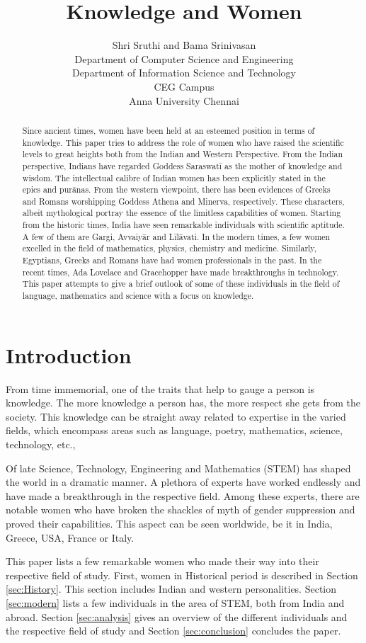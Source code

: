 \documentclass[a4paper,10pt]{article}
\title{Knowledge and Women}
\author{Shri Sruthi and Bama Srinivasan \\  Department of Computer Science and Engineering \\  Department of Information Science and Technology \\ CEG Campus \\Anna University Chennai}
\date{}
\begin{document}
\maketitle

\begin{abstract}
Since ancient times, women have been held at an esteemed position in terms of knowledge. This paper tries to address the role of women who have raised the scientific levels to great heights both from the Indian and Western Perspective. From the Indian perspective, Indians have regarded Goddess Saraswat\={i} as the mother of knowledge and wisdom. The intellectual calibre of Indian women has been explicitly stated in the epics and pur\={a}nas. From the western viewpoint,  there has been evidences of Greeks and Romans worshipping Goddess Athena and Minerva, respectively. These characters, albeit mythological portray the essence of the limitless capabilities of women. Starting from the historic times, India have seen remarkable individuals with scientific aptitude. A few of them are Gargi, Avvaiy\={a}r and L\={i}l\={a}vati. In the modern times, a few women excelled in the field of mathematics, physics, chemistry and medicine. Similarly, Egyptians, Greeks and Romans have had women professionals in the past. In 
the recent times, Ada Lovelace and Gracehopper have made breakthroughs in technology. This paper attempts to give a brief outlook of some of these individuals in the field of language, mathematics and science with a focus on knowledge. 
\end{abstract}
\section{Introduction}
From time immemorial, one of the traits that help to gauge a person is knowledge. The more knowledge a person has, the more respect she gets from the society. This knowledge can be straight away related to expertise in the varied fields, which encompass areas such as language, poetry, mathematics, science, technology, etc., 

Of late Science, Technology, Engineering and Mathematics (STEM) has shaped the world in a dramatic manner. A plethora of experts have worked endlessly and have made a breakthrough in the respective field. Among these experts, there are notable women who have broken the shackles of myth of gender suppression and proved their capabilities. This aspect can be seen worldwide, be it in India, Greece, USA, France or Italy. 

This paper lists a few remarkable women who made their way into their respective field of study. First, women in Historical period is described in Section \ref{sec:History}. This section includes Indian and western personalities. Section \ref{sec:modern} lists a few individuals in the area of STEM, both from India and abroad. Section \ref{sec:analysis} gives an overview of the different individuals and the respective field of study and Section \ref{sec:conclusion} concludes the paper. 
\end{document}
